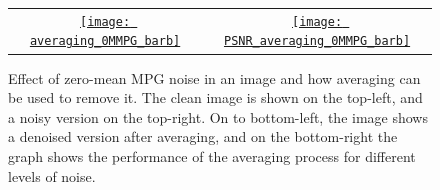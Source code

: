 \documentclass{article}
\begin{document}
\begin{figure}
{\begin{tabular}{cc}
      \href{https://nbviewer.org/github/vicente-gonzalez-ruiz/denoising/blob/main/figs/averaging_denoising.ipynb\#averaging_0MMPG_barb}{\texttt{[image: averaging\_0MMPG\_barb]}} & \href{https://nbviewer.org/github/vicente-gonzalez-ruiz/denoising/blob/main/figs/averaging_denoising.ipynb\#PSNR_averaging_0MMPG_barb}{\texttt{[image: PSNR\_averaging\_0MMPG\_barb]}}
    \end{tabular}
  }
  \caption{Effect of zero-mean MPG noise in an image and how averaging
    can be used to remove it. The clean image is shown on the
    top-left, and a noisy version on the top-right. On to bottom-left,
    the image shows a denoised version after averaging, and on the
    bottom-right the graph shows the performance of the averaging
    process for different levels of noise.\label{fig:averaging_0MMPG}}
\end{figure}
\end{document}
